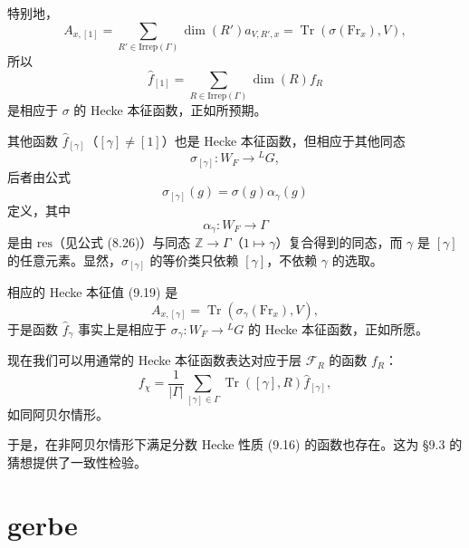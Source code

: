\documentclass[11pt,a4paper]{article}
\newcommand{\Tr}{\operatorname{Tr}}
\begin{document}

特别地，
\[
A_{x,[1]} = \sum_{R'\in\mathrm{Irrep}(\Gamma)}\dim(R')a_{V,R',x} = \Tr(\sigma(\mathrm{Fr}_x),V),
\]
所以
\[
\widehat{f}_{[1]} = \sum_{R\in\mathrm{Irrep}(\Gamma)}\dim(R)f_R
\]
是相应于 $\sigma$ 的 Hecke 本征函数，正如所预期。

其他函数 $\widehat{f}_{[\gamma]}$（$[\gamma]\neq[1]$）也是 Hecke 本征函数，但相应于其他同态
\[
\sigma_{[\gamma]}: W_F\to{}^{L}G,
\]
后者由公式
\[
\sigma_{[\gamma]}(g) = \sigma(g)\alpha_\gamma(g)
\]
定义，其中
\[
\alpha_\gamma: W_F\to\Gamma
\]
是由 $\mathrm{res}$（见公式 (8.26)）与同态 $\mathbb{Z}\to\Gamma$（$1\mapsto\gamma$）复合得到的同态，而 $\gamma$ 是 $[\gamma]$ 的任意元素。显然，$\sigma_{[\gamma]}$ 的等价类只依赖 $[\gamma]$，不依赖 $\gamma$ 的选取。

相应的 Hecke 本征值 (9.19) 是
\[
A_{x,[\gamma]} = \Tr(\sigma_\gamma(\mathrm{Fr}_x),V),
\]
于是函数 $\widehat{f}_\gamma$ 事实上是相应于 $\sigma_\gamma: W_F\to{}^{L}G$ 的 Hecke 本征函数，正如所愿。

现在我们可以用通常的 Hecke 本征函数表达对应于层 $\mathcal{F}_R$ 的函数 $f_R$：
\[
f_\chi = \frac{1}{|\Gamma|}\sum_{[\gamma]\in\Gamma}\Tr([\gamma],R)\widehat{f}_{[\gamma]},
\]
如同阿贝尔情形。

于是，在非阿贝尔情形下满足分数 Hecke 性质 (9.16) 的函数也存在。这为 §9.3 的猜想提供了一致性检验。




\section{gerbe}
\end{document}
